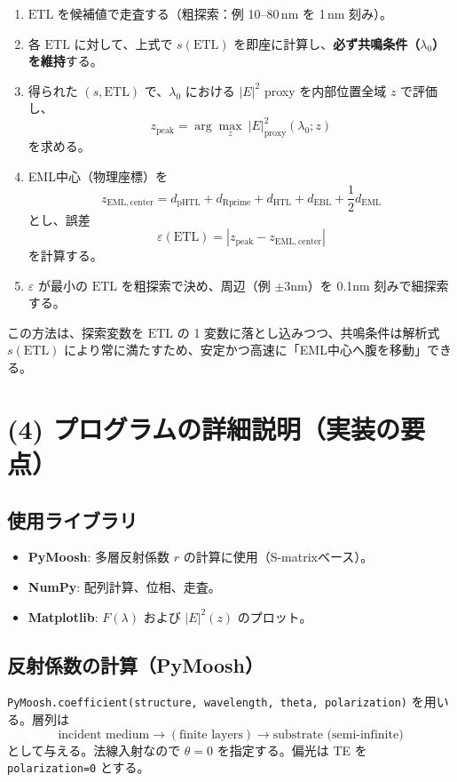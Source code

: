 \begin{enumerate}
\item \(\mathrm{ETL}\) を候補値で走査する（粗探索：例 10--80\,nm を 1\,nm 刻み）。
\item 各 \(\mathrm{ETL}\) に対して、上式で \(s(\mathrm{ETL})\) を即座に計算し、\textbf{必ず共鳴条件（\(\lambda_0\)）を維持}する。
\item 得られた \((s,\mathrm{ETL})\) で、\(\lambda_0\) における \(|E|^2\) proxy を内部位置全域 \(z\) で評価し、
\[
z_{\mathrm{peak}}=\arg\max_z\ |E|^2_{\mathrm{proxy}}(\lambda_0; z)
\]
を求める。
\item EML中心（物理座標）を
\[
z_{\mathrm{EML,center}}=
d_{\mathrm{pHTL}}+d_{\mathrm{Rprime}}+d_{\mathrm{HTL}}+d_{\mathrm{EBL}}+\frac{1}{2}d_{\mathrm{EML}}
\]
とし、誤差
\[
\varepsilon(\mathrm{ETL})=\left|z_{\mathrm{peak}}-z_{\mathrm{EML,center}}\right|
\]
を計算する。
\item \(\varepsilon\) が最小の \(\mathrm{ETL}\) を粗探索で決め、周辺（例 \(\pm 3\)nm）を 0.1nm 刻みで細探索する。
\end{enumerate}

この方法は、探索変数を \(\mathrm{ETL}\) の 1 変数に落とし込みつつ、共鳴条件は解析式 \(s(\mathrm{ETL})\) により常に満たすため、安定かつ高速に「EML中心へ腹を移動」できる。

\section{(4) プログラムの詳細説明（実装の要点）}

\subsection{使用ライブラリ}
\begin{itemize}
\item \textbf{PyMoosh}: 多層反射係数 \(r\) の計算に使用（S-matrixベース）。
\item \textbf{NumPy}: 配列計算、位相、走査。
\item \textbf{Matplotlib}: \(F(\lambda)\) および \(|E|^2(z)\) のプロット。
\end{itemize}

\subsection{反射係数の計算（PyMoosh）}
\texttt{PyMoosh.coefficient(structure, wavelength, theta, polarization)} を用いる。層列は
\[
\text{incident medium} \rightarrow (\text{finite layers}) \rightarrow \text{substrate (semi-infinite)}
\]
として与える。法線入射なので \(\theta=0\) を指定する。偏光は TE を \texttt{polarization=0} とする。

